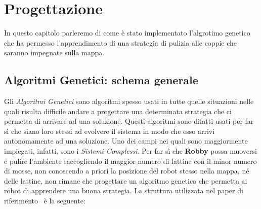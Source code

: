\chapter{Progettazione}
In questo capitolo parleremo di come è stato implementato l'algrotimo genetico
che ha permesso l'apprendimento di una strategia di pulizia alle coppie che
saranno impegnate sulla mappa.

\section{Algoritmi Genetici: schema generale}
Gli \textit{Algoritmi Genetici} sono algoritmi spesso usati in tutte quelle
situazioni nelle quali risulta difficile andare a progettare una determinata
strategia che ci permetta di arrivare ad una soluzione. Questi algoritmi sono
difatti usati per far sì che siano loro stessi ad evolvere il sistema in modo
che esso arrivi autonomamente ad una soluzione. Uno dei campi nei quali sono
maggiormente impiegati, infatti, sono i \textit{Sistemi Complessi}.\newline
Per far sì che \textbf{Robby} possa muoversi e pulire l'ambiente raccogliendo il
maggior numero di lattine con il minor numero di mosse, non conoscendo a priori
la posizione del robot stesso nella mappa, né delle lattine, non rimane che
progettare un algoritmo genetico che permetta ai robot di apprendere una buona
strategia.\newline
La struttura utilizzata nel paper di riferimento~\cite{biblio:robby} è la
seguente:
